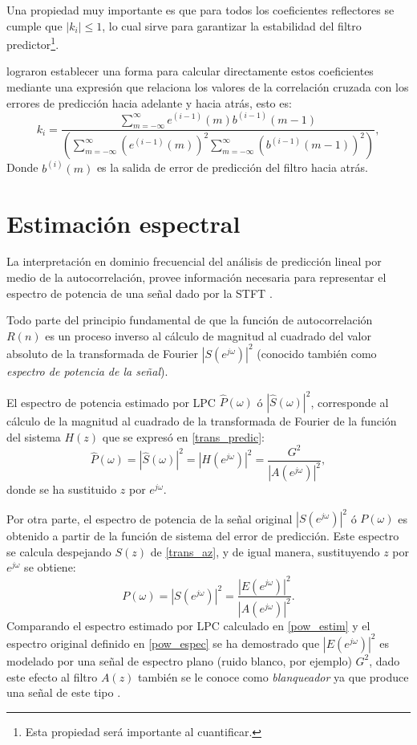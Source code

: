 Una propiedad muy importante es que para todos los coeficientes reflectores se cumple que $|k_i|\leq 1$, lo cual sirve para garantizar la estabilidad del filtro predictor\footnote{Esta propiedad será importante al cuantificar.}.

 \cite{Itakura1975,Itakura1968} lograron establecer una forma para calcular directamente estos coeficientes mediante una expresión que relaciona los valores de la correlación cruzada con los errores de predicción hacia adelante y hacia atrás, esto es:
\begin{equation}
k_i =\frac{\displaystyle \sum_{m=-\infty}^\infty e^{(i-1)}(m)b^{(i-1)}(m-1)}{\displaystyle\left(\sum_{m=-\infty}^\infty \left(e^{(i-1)}(m)\right)^2 \sum_{m=-\infty}^{\infty}\left(b^{(i-1)}(m-1)\right)^2 \right)},
\end{equation}
Donde $b^{(i)}(m)$ es la salida de error de predicción del filtro hacia atrás. 
\section{Estimación espectral}
 La interpretación en dominio frecuencial del análisis de predicción lineal por medio de la autocorrelación, provee información necesaria para representar el espectro de potencia de una señal dado por la STFT \cite[]{Rabiner1993}. 

Todo parte del principio fundamental de que la función de autocorrelación $R(n)$ es un proceso inverso al cálculo de magnitud al cuadrado del valor absoluto de la transformada de Fourier $|S(e^{j\omega})|^{2}$ (conocido también como \emph{espectro de potencia de la señal}). 

El espectro de potencia estimado por LPC $\widehat{P}(\omega)$ ó $|\widehat{S}(\omega)|^{2}$, corresponde al cálculo de la magnitud al cuadrado de la transformada de Fourier de la función del sistema $H(z)$ que se expresó en \eqref{trans_predic}:
\begin{equation}\label{pow_estim}
\widehat{P}(\omega)=|\widehat{S}(\omega)|^{2}=|H(e^{j\omega})|^2=\frac{G^2}{|A(e^{j\omega})|^2},
\end{equation}
donde se ha sustituido $z$ por $e^{j\omega}$.

Por otra parte, el espectro de potencia de la señal original $|S(e^{j\omega})|^{2}$ ó $P(\omega)$ es obtenido a partir de la función de sistema del error de predicción. Este espectro se calcula despejando $S(z)$ de \eqref{trans_az}, y de igual manera, sustituyendo $z$ por $e^{j\omega}$ se obtiene:
\begin{equation}\label{pow_espec}
P(\omega) = |S(e^{j\omega})|^{2} =\frac{|E(e^{j\omega})|^2}{|A(e^{j\omega})|^2}.
\end{equation}
Comparando el espectro estimado por LPC calculado en \eqref{pow_estim} y el espectro original definido en \eqref{pow_espec} se ha demostrado que $|E(e^{j\omega})|^2$ es modelado por una señal de espectro plano (ruido blanco, por ejemplo) $G^2$, dado este efecto al filtro $A(z)$ también se le conoce como \emph{blanqueador} ya que produce una señal de este tipo \cite[]{Makhoul1973}.

